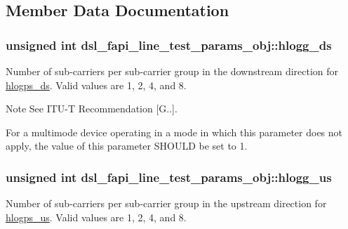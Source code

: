 \subsection{Member Data Documentation}
\hypertarget{structdsl__fapi__line__test__params__obj_aa26cbe2bda655479cb8e69914432baba}{
\subsubsection[{hlogg\-\_\-ds}]{\setlength{\rightskip}{0pt plus 5cm}unsigned int dsl\-\_\-fapi\-\_\-line\-\_\-test\-\_\-params\-\_\-obj\-::hlogg\-\_\-ds}}\label{structdsl__fapi__line__test__params__obj_aa26cbe2bda655479cb8e69914432baba}
Number of sub-\/carriers per sub-\/carrier group in the downstream direction for \hyperlink{structdsl__fapi__line__test__params__obj_a5f64a314b926de0db42b37c794f14daf}{hlogps\-\_\-ds}. Valid values are 1, 2, 4, and 8. \begin{DoxyNote}{Note}
See I\-T\-U-\/\-T Recommendation \mbox{[}G..\mbox{]}. 

For a multimode device operating in a mode in which this parameter does not apply, the value of this parameter S\-H\-O\-U\-L\-D be set to 1. 
\end{DoxyNote}
\hypertarget{structdsl__fapi__line__test__params__obj_accedc3faf0cb39a02ecbcb39635b1cf4}{
\subsubsection[{hlogg\-\_\-us}]{\setlength{\rightskip}{0pt plus 5cm}unsigned int dsl\-\_\-fapi\-\_\-line\-\_\-test\-\_\-params\-\_\-obj\-::hlogg\-\_\-us}}\label{structdsl__fapi__line__test__params__obj_accedc3faf0cb39a02ecbcb39635b1cf4}
Number of sub-\/carriers per sub-\/carrier group in the upstream direction for \hyperlink{structdsl__fapi__line__test__params__obj_a7d6db75c174584b2fdc5ab0e8ee3d499}{hlogps\-\_\-us}. Valid values are 1, 2, 4, and 8.

